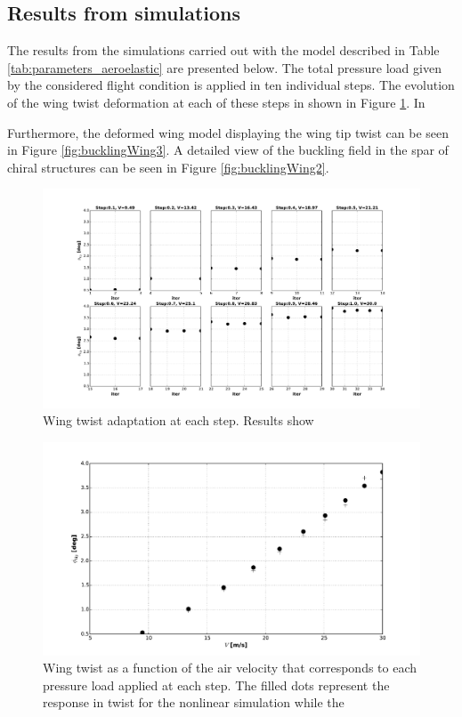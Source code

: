     \clearpage
    \subsection{Results from simulations} \label{subsec:results_aeroelastic}

      The results from the simulations carried out with the model described in Table \ref{tab:parameters_aeroelastic} are presented below. The total pressure load given by the considered flight condition is applied in ten individual steps. The evolution of the wing twist deformation at each of these steps in shown in Figure \ref{fig:twist_perIter_s3_V30}. In 

      Furthermore, the deformed wing model displaying the wing tip twist can be seen in Figure \ref{fig:bucklingWing3}. A detailed view of the buckling field in the spar of chiral structures can be seen in Figure \ref{fig:bucklingWing2}.

      \begin{figure}[!htpb]
        \centering
        \includegraphics[width=0.95 \textwidth]{figures/wing-model/twist_perIter_s3_V30}
        \caption[Wing twist adaptation at each step]{Wing twist adaptation at each step. Results show}
        \label{fig:twist_perIter_s3_V30}
      \end{figure}

      \begin{figure}[!htpb]
        \centering
        \includegraphics[width=0.8 \textwidth]{figures/wing-model/twist_perV_s3_V30}
        \caption[Wing twist as a function of the air velocity]{Wing twist as a function of the air velocity that corresponds to each pressure load applied at each step. The filled dots represent the response in twist for the nonlinear simulation while the }
        \label{fig:twist_perV_s3_V30}
      \end{figure}

